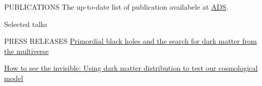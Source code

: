\documentclass{../sty/resume} %
\begin{document}
\clearpage
\begin{rSection}{PUBLICATIONS}
    The up-to-date list of publication availabele at \href{https://ui.adsabs.harvard.edu/search/filter_author_facet_hier_fq_author=AND&filter_author_facet_hier_fq_author=author_facet_hier%3A%221%2FSugiyama%2C%20S%2FSugiyama%2C%20Sunao%22&fq=%7B!type%3Daqp%20v%3D%24fq_author%7D&fq_author=(author_facet_hier%3A%221%2FSugiyama%2C%20S%2FSugiyama%2C%20Sunao%22)&q=pubdate%3A%5B2001-01%20TO%209999-12%5D%20author%3A(%22Sugiyama%2CSunao%22)&sort=date%20desc%2C%20bibcode%20desc&p_=0}{ADS}.
      \vspace{-33em}
    
    
\end{rSection}

\begin{rSection}{Selected talks}
    
\end{rSection}

\begin{rSection}{PRESS RELEASES}
  \href{https://www.ipmu.jp/en/20201224-PBH-multiverse}{Primordial black holes and the search for dark matter from the multiverse}

  \href{https://www.ipmu.jp/en/20230404-darkmatter}{How to see the invisible: Using dark matter distribution to test our cosmological model}
\end{rSection}
\end{document}
